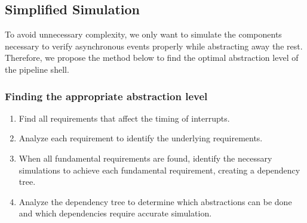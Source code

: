 \subsection{Simplified Simulation} 



To avoid unnecessary complexity, we only want to simulate the components necessary to verify asynchronous events properly while abstracting away the rest. Therefore, we propose the method below to find the optimal abstraction level of the pipeline shell.

\subsubsection{Finding the appropriate abstraction level}

\begin{enumerate}
    \item Find all requirements that affect the timing of interrupts.
    \item Analyze each requirement to identify the underlying requirements. 
    \item When all fundamental requirements are found, identify the necessary simulations to achieve each fundamental requirement, creating a dependency tree.
    \item Analyze the dependency tree to determine which abstractions can be done and which dependencies require accurate simulation.
\end{enumerate}

